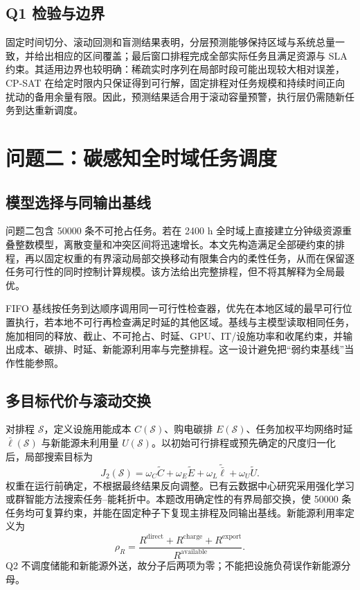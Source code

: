 \subsection{Q1 检验与边界}

固定时间切分、滚动回测和盲测结果表明，分层预测能够保持区域与系统总量一致，并给出相应的区间覆盖；最后窗口排程完成全部实际任务且满足资源与 SLA 约束。其适用边界也较明确：稀疏实时序列在局部时段可能出现较大相对误差，CP-SAT 在给定时限内只保证得到可行解，固定排程对任务规模和持续时间正向扰动的备用余量有限。因此，预测结果适合用于滚动容量预警，执行层仍需随新任务到达重新调度。

\section{问题二：碳感知全时域任务调度}
\label{sec:q2}

\subsection{模型选择与同输出基线}

问题二包含 50000 条不可抢占任务。若在 2400 h 全时域上直接建立分钟级资源重叠整数模型，离散变量和冲突区间将迅速增长。本文先构造满足全部硬约束的排程，再以固定权重的有界滚动局部交换移动有限集合内的柔性任务，从而在保留逐任务可行性的同时控制计算规模。该方法给出完整排程，但不将其解释为全局最优。

FIFO 基线按任务到达顺序调用同一可行性检查器，优先在本地区域的最早可行位置执行，若本地不可行再检查满足时延的其他区域。基线与主模型读取相同任务，施加相同的释放、截止、不可抢占、时延、GPU、IT/设施功率和收尾约束，并输出成本、碳排、时延、新能源利用率与完整排程。这一设计避免把“弱约束基线”当作性能参照。

\subsection{多目标代价与滚动交换}

对排程 $\mathcal S$，定义设施用能成本 $C(\mathcal S)$、购电碳排 $E(\mathcal S)$、任务加权平均网络时延 $\bar\ell(\mathcal S)$ 与新能源未利用量 $U(\mathcal S)$。以初始可行排程或预先确定的尺度归一化后，局部搜索目标为
\begin{equation}
  J_2(\mathcal S)=\omega_C\widetilde C+\omega_E\widetilde E
  +\omega_L\widetilde{\bar\ell}+\omega_U\widetilde U.
  \label{eq:q2-objective}
\end{equation}
权重在运行前确定，不根据最终结果反向调整。已有云数据中心研究采用强化学习或群智能方法搜索任务--能耗折中。本题改用确定性的有界局部交换，使 50000 条任务均可复算约束，并能在固定种子下复现主排程及同输出基线。新能源利用率定义为
\begin{equation}
  \rho_R=\frac{R^{\mathrm{direct}}+R^{\mathrm{charge}}+R^{\mathrm{export}}}{R^{\mathrm{available}}}.
  \label{eq:renewable-utilization}
\end{equation}
Q2 不调度储能和新能源外送，故分子后两项为零；不能把设施负荷误作新能源分母。

